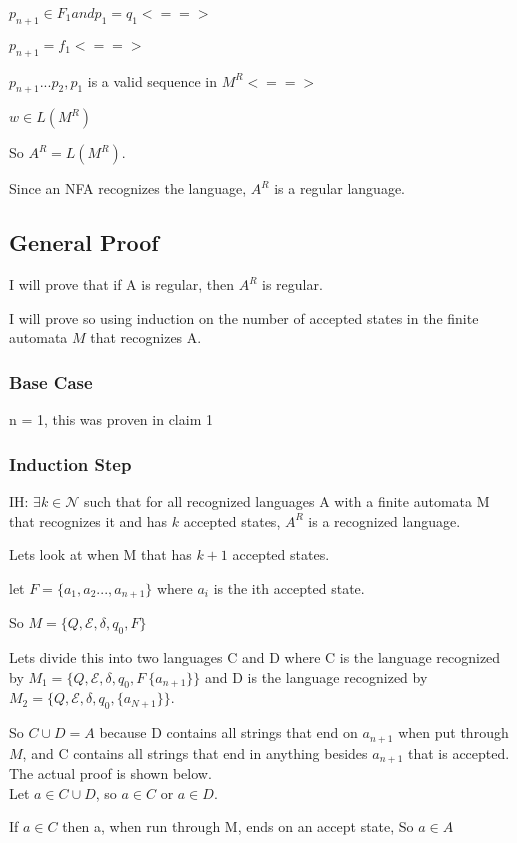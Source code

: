 \documentclass[letterpaper, 11pt]{article}
\begin{document}
$p_{n+1} \in F_1 and p_1 = q_1 <==>$

$p_{n+1} = f_1 <==>$

$p_{n+1} ... p_2, p_1$ is a valid sequence in $M^R <==>$

$w \in L(M^R)$

So $A^R = L(M^R)$.

Since an NFA recognizes the language, $A^R$ is a regular language.

\subsection*{General Proof}
I will prove that if A is regular, then $A^R$ is regular.

I will prove so using induction on the number of accepted states in the finite automata $M$ that recognizes A.

\subsubsection*{Base Case}
n = 1, this was proven in claim 1
\subsubsection*{Induction Step}
IH: $\exists k \in \mathcal{N}$ such that for all recognized languages A with a finite automata M that recognizes it and has $k$ accepted states, $A^R$ is a recognized language.

Lets look at when M that has $k + 1$ accepted states.

let $F = \{a_1, a_2 ... , a_{n+1}\}$ where $a_i$ is the ith accepted state.

So $M = \{Q, \mathcal{E}, \delta, q_0, F \}$

Lets divide this into two languages C and D where C is the language recognized by $M_1 = \{Q, \mathcal{E}, \delta, q_0, F \ \{a_{n+1}\}\}$ and D is the language recognized by $M_2 = \{Q, \mathcal{E}, \delta, q_0, \{a_{N+1}\}\}$.

So $C \cup D = A$ because D contains all strings that end on $a_{n+1}$ when put through $M$, and C contains all strings that end in anything besides $a_{n+1}$ that is accepted.
The actual proof is shown below.\\

Let $a \in C \cup D$, so $a \in C$ or $a \in D$.

If $a \in C$ then a, when run through M, ends on an accept state, So $a \in A$
\end{document}
